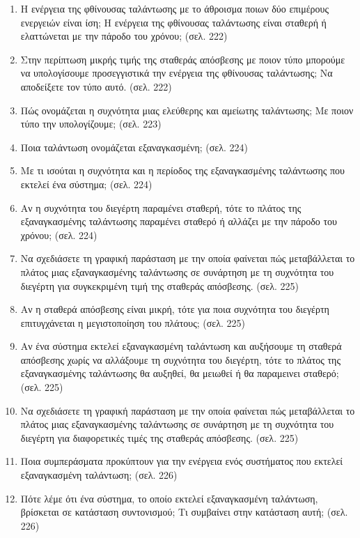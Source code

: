 \documentclass{article}
\begin{document}
\begin{enumerate}
      \item Η ενέργεια της φθίνουσας ταλάντωσης με το άθροισμα ποιων δύο επιμέρους ενεργειών είναι ίση; Η ενέργεια της φθίνουσας ταλάντωσης είναι σταθερή ή ελαττώνεται με την πάροδο του χρόνου; (σελ. 222)

      \item Στην περίπτωση μικρής τιμής της σταθεράς απόσβεσης με ποιον τύπο μπορούμε να υπολογίσουμε προσεγγιστικά την ενέργεια της φθίνουσας ταλάντωσης; Να αποδείξετε τον τύπο αυτό. (σελ. 222)

      \item Πώς ονομάζεται η συχνότητα μιας ελεύθερης και αμείωτης ταλάντωσης; Με ποιον τύπο την υπολογίζουμε; (σελ. 223)

      \item Ποια ταλάντωση ονομάζεται εξαναγκασμένη; (σελ. 224)

      \item Με τι ισούται η συχνότητα και η περίοδος της εξαναγκασμένης ταλάντωσης που εκτελεί ένα σύστημα; (σελ. 224)

      \item Αν η συχνότητα του διεγέρτη παραμένει σταθερή, τότε το πλάτος της εξαναγκασμένης ταλάντωσης παραμένει σταθερό ή αλλάζει με την πάροδο του χρόνου; (σελ. 224)

      \item Να σχεδιάσετε τη γραφική παράσταση με την οποία φαίνεται πώς μεταβάλλεται το πλάτος μιας εξαναγκασμένης ταλάντωσης σε συνάρτηση με τη συχνότητα του διεγέρτη για συγκεκριμένη τιμή της σταθεράς απόσβεσης. (σελ. 225)

      \item Αν η σταθερά απόσβεσης είναι μικρή, τότε για ποια συχνότητα του διεγέρτη επιτυγχάνεται η μεγιστοποίηση του πλάτους; (σελ. 225)

      \item Αν ένα σύστημα εκτελεί εξαναγκασμένη ταλάντωση και αυξήσουμε τη σταθερά απόσβεσης χωρίς να αλλάξουμε τη συχνότητα του διεγέρτη, τότε το πλάτος της εξαναγκασμένης ταλάντωσης θα αυξηθεί, θα μειωθεί ή θα παραμεινει σταθερό; (σελ. 225)

      \item Να σχεδιάσετε τη γραφική παράσταση με την οποία φαίνεται πώς μεταβάλλεται το πλάτος μιας εξαναγκασμένης ταλάντωσης σε συνάρτηση με τη συχνότητα του διεγέρτη για διαφορετικές τιμές της σταθεράς απόσβεσης. (σελ. 225)

      \item Ποια συμπεράσματα προκύπτουν για την ενέργεια ενός συστήματος που εκτελεί εξαναγκασμένη ταλάντωση; (σελ. 226)

      \item Πότε λέμε ότι ένα σύστημα, το οποίο εκτελεί εξαναγκασμένη ταλάντωση, βρίσκεται σε κατάσταση συντονισμού; Τι συμβαίνει στην κατάσταση αυτή; (σελ. 226)
\end{enumerate}
\end{document}
